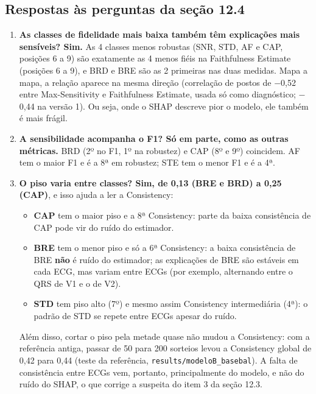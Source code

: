 \documentclass[11pt,a4paper]{article}
\begin{document}
\subsection{Respostas às perguntas da seção 12.4}
\begin{enumerate}
\item \textbf{As classes de fidelidade mais baixa também têm explicações mais sensíveis? Sim.} As 4 classes menos robustas (SNR, STD, AF e CAP, posições 6 a 9) são exatamente as 4 menos fiéis na Faithfulness Estimate (posições 6 a 9), e BRD e BRE são as 2 primeiras nas duas medidas. Mapa a mapa, a relação aparece na mesma direção (correlação de postos de $-$0,52 entre Max-Sensitivity e Faithfulness Estimate, usada só como diagnóstico; $-$0,44 na versão 1). Ou seja, onde o SHAP descreve pior o modelo, ele também é mais frágil.
\item \textbf{A sensibilidade acompanha o F1? Só em parte, como as outras métricas.} BRD (2º no F1, 1º na robustez) e CAP (8º e 9º) coincidem. AF tem o maior F1 e é a 8ª em robustez; STE tem o menor F1 e é a 4ª.
\item \textbf{O piso varia entre classes? Sim, de 0,13 (BRE e BRD) a 0,25 (CAP)}, e isso ajuda a ler a Consistency:
\begin{itemize}
\item \textbf{CAP} tem o maior piso e a 8ª Consistency: parte da baixa consistência de CAP pode vir do ruído do estimador.
\item \textbf{BRE} tem o menor piso e só a 6ª Consistency: a baixa consistência de BRE \textbf{não} é ruído do estimador; as explicações de BRE são estáveis em cada ECG, mas variam entre ECGs (por exemplo, alternando entre o QRS de V1 e o de V2).
\item \textbf{STD} tem piso alto (7º) e mesmo assim Consistency intermediária (4ª): o padrão de STD se repete entre ECGs apesar do ruído.
\end{itemize}
Além disso, cortar o piso pela metade quase não mudou a Consistency: com a referência antiga, passar de 50 para 200 sorteios levou a Consistency global de 0,42 para 0,44 (teste da referência, \texttt{results/modeloB\_basebal}). A falta de consistência entre ECGs vem, portanto, principalmente do modelo, e não do ruído do SHAP, o que corrige a suspeita do item 3 da seção 12.3.
\end{enumerate}
\end{document}
